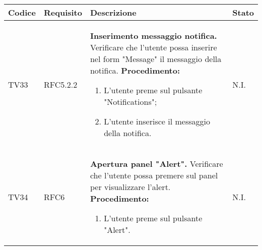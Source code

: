 \begin{table}[!htpb]
	\centering
	\renewcommand{\arraystretch}{2} 
	\begin{tabular}{|l|l|p{10cm}|l|}
		\rowcolor{orange!50}
		\hline
		\textbf{Codice} & \textbf{Requisito}& \textbf{Descrizione} & \textbf{Stato}\\ 
		\hline
		TV33 & RFC5.2.2 &
			\textbf{Inserimento messaggio notifica.}
			\newline
			Verificare che l'utente possa inserire nel form "Message" il messaggio della notifica.
			\newline
			\textbf{Procedimento:}
			\begin{enumerate}
				\item L'utente preme sul pulsante "Notifications"; 
				\item L’utente inserisce il messaggio della notifica.
			\end{enumerate} 
			& N.I.\\
		\hline
		TV34 & RFC6 &
			\textbf{Apertura panel "Alert".}
			\newline
			Verificare che l'utente possa premere sul panel per visualizzare l’alert.
			\newline
			\textbf{Procedimento:}
			\begin{enumerate}
				\item L’utente preme sul pulsante "Alert".
			\end{enumerate} 
			& N.I.\\
		\hline
	\end{tabular}
\end{table}
